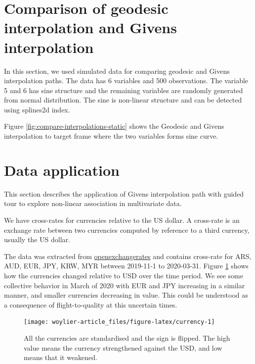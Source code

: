 \hypertarget{comparison-of-geodesic-interpolation-and-givens-interpolation}{%
\section{Comparison of geodesic interpolation and Givens interpolation}\label{comparison-of-geodesic-interpolation-and-givens-interpolation}}

In this section, we used simulated data for comparing geodesic and Givens interpolation paths. The data has 6 variables and 500 observations. The variable 5 and 6 has sine structure and the remaining variables are randomly generated from normal distribution. The sine is non-linear structure and can be detected using splines2d index.

Figure \ref{fig:compare-interpolations-static} shows the Geodesic and Givens interpolation to target frame where the two variables forms sine curve.

\hypertarget{data-application}{%
\section{Data application}\label{data-application}}

This section describes the application of Givens interpolation path with guided tour to explore non-linear association in multivariate data.

We have cross-rates for currencies relative to the US dollar. A cross-rate is an exchange rate between two currencies computed by reference to a third currency, usually the US dollar.

The data was extracted from \href{https://openexchangerates.org}{openexchangerates} and contains cross-rate for ARS, AUD, EUR, JPY, KRW, MYR between 2019-11-1 to 2020-03-31. Figure \ref{fig:currency} shows how the currencies changed relative to USD over the time period. We see some collective behavior in March of 2020 with EUR and JPY increasing in a similar manner, and smaller currencies decreasing in value. This could be understood as a consequence of flight-to-quality at this uncertain times.

\begin{figure}
\texttt{[image: woylier-article\_files/figure-latex/currency-1]} \caption{All the currencies are standardised and the sign is flipped. The high value means the currency strengthened against the USD, and low means that it weakened.}\label{fig:currency}
\end{figure}


